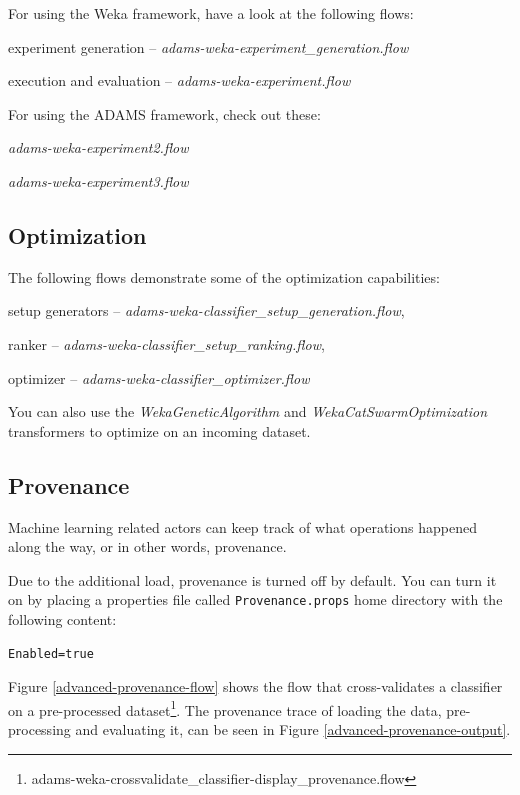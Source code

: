 For using the Weka framework, have a look at the following flows:
\begin{tight_itemize}
  \item experiment generation -- \textit{adams-weka-experiment\_generation.flow}
  \item execution and evaluation -- \textit{adams-weka-experiment.flow}
\end{tight_itemize}

For using the ADAMS framework, check out these:
\begin{tight_itemize}
  \item \textit{adams-weka-experiment2.flow}
  \item \textit{adams-weka-experiment3.flow}
\end{tight_itemize}

\subsection{Optimization}
The following flows demonstrate some of the optimization capabilities:
\begin{tight_itemize}
  \item setup generators -- \textit{adams-weka-classifier\_setup\_generation.flow},
  \item ranker -- \textit{adams-weka-classifier\_setup\_ranking.flow},
  \item optimizer -- \textit{adams-weka-classifier\_optimizer.flow}
\end{tight_itemize}

You can also use the \textit{WekaGeneticAlgorithm} and
\textit{WekaCatSwarmOptimization} transformers to optimize on an incoming
dataset.

\subsection{Provenance}
Machine learning related actors can keep track of what operations happened
along the way, or in other words, provenance.

Due to the additional load, provenance is turned off by default. You can turn
it on by placing a properties file called \texttt{Provenance.props}
home directory with the following content:
\begin{verbatim}
Enabled=true
\end{verbatim}

Figure \ref{advanced-provenance-flow} shows the flow that cross-validates a
classifier on a pre-processed dataset\footnote{adams-weka-crossvalidate\_classifier-display\_provenance.flow}.
The provenance trace of loading the data, pre-processing and evaluating it, can be seen in Figure
\ref{advanced-provenance-output}.

